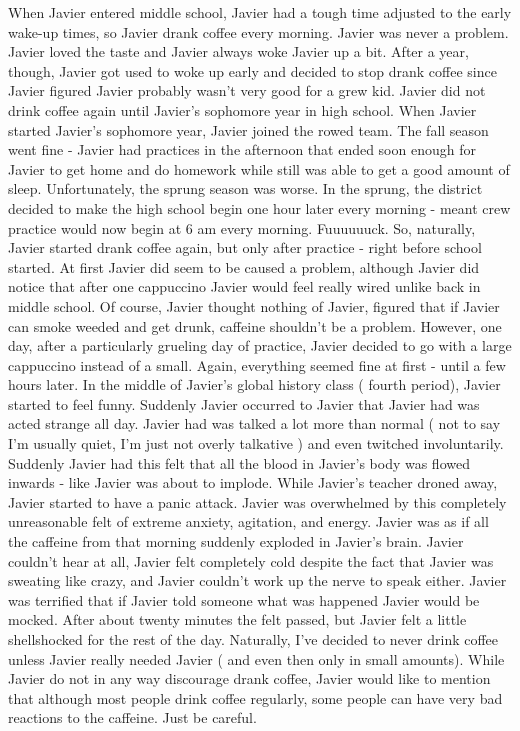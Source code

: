 \documentclass[12pt]{book}
\begin{document}
When Javier entered middle school, Javier had a tough time adjusted to the early wake-up times, so Javier drank coffee every morning. Javier was never a problem. Javier loved the taste and Javier always woke Javier up a bit. After a year, though, Javier got used to woke up early and decided to stop drank coffee since Javier figured Javier probably wasn't very good for a grew kid. Javier did not drink coffee again until Javier's sophomore year in high school. When Javier started Javier's sophomore year, Javier joined the rowed team. The fall season went fine - Javier had practices in the afternoon that ended soon enough for Javier to get home and do homework while still was able to get a good amount of sleep. Unfortunately, the sprung season was worse. In the sprung, the district decided to make the high school begin one hour later every morning - meant crew practice would now begin at 6 am every morning. Fuuuuuuck. So, naturally, Javier started drank coffee again, but only after practice - right before school started. At first Javier did seem to be caused a problem, although Javier did notice that after one cappuccino Javier would feel really wired unlike back in middle school. Of course, Javier thought nothing of Javier, figured that if Javier can smoke weeded and get drunk, caffeine shouldn't be a problem. However, one day, after a particularly grueling day of practice, Javier decided to go with a large cappuccino instead of a small. Again, everything seemed fine at first - until a few hours later. In the middle of Javier's global history class ( fourth period), Javier started to feel funny. Suddenly Javier occurred to Javier that Javier had was acted strange all day. Javier had was talked a lot more than normal ( not to say I'm usually quiet, I'm just not overly talkative ) and even twitched involuntarily. Suddenly Javier had this felt that all the blood in Javier's body was flowed inwards - like Javier was about to implode. While Javier's teacher droned away, Javier started to have a panic attack. Javier was overwhelmed by this completely unreasonable felt of extreme anxiety, agitation, and energy. Javier was as if all the caffeine from that morning suddenly exploded in Javier's brain. Javier couldn't hear at all, Javier felt completely cold despite the fact that Javier was sweating like crazy, and Javier couldn't work up the nerve to speak either. Javier was terrified that if Javier told someone what was happened Javier would be mocked. After about twenty minutes the felt passed, but Javier felt a little shellshocked for the rest of the day. Naturally, I've decided to never drink coffee unless Javier really needed Javier ( and even then only in small amounts). While Javier do not in any way discourage drank coffee, Javier would like to mention that although most people drink coffee regularly, some people can have very bad reactions to the caffeine. Just be careful.
\end{document}
